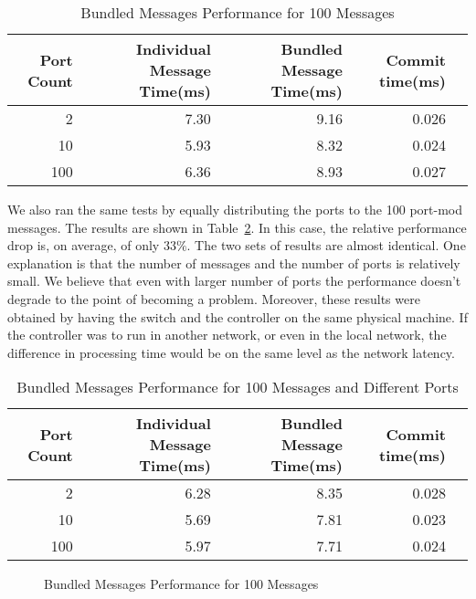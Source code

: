 \begin{table}[h]
  \centering
  \begin{tabular}{rrrrr}
    \toprule
      Port Count & Individual Message Time(ms) & Bundled Message Time(ms) & Commit time(ms) \\
    \midrule
        2 & 7.30 & 9.16 & 0.026 \\
       10 & 5.93 & 8.32 & 0.024 \\
       100 & 6.36 & 8.93 & 0.027 \\
    \bottomrule
  \end{tabular}
  \caption{Bundled Messages Performance for 100 Messages}
    \label{tbl:bundleperf}
\end{table}

We also ran the same tests by equally distributing the ports to the 100 port-mod messages. The results
are shown in Table~\ref{tbl:bundleperf2}. In this case, the relative performance drop is, on average, of only $33\%$.
The two sets of results are almost identical. One explanation is that the number of messages and the number of
ports is relatively small. We believe that even with larger number of ports the performance doesn't degrade
to the point of becoming a problem. Moreover, these results were obtained by having the switch and the controller
on the same physical machine. If the controller was to run in another network, or even in the local network,
the difference in processing time would be on the same level as the network latency.

\begin{table}[h]
  \centering
  \begin{tabular}{rrrrr}
    \toprule
      Port Count & Individual Message Time(ms) & Bundled Message Time(ms) & Commit time(ms) \\
    \midrule
        2 & 6.28 & 8.35 & 0.028 \\
       10 & 5.69 & 7.81 & 0.023 \\
       100 & 5.97 & 7.71 & 0.024 \\
    \bottomrule
  \end{tabular}
  \caption{Bundled Messages Performance for 100 Messages and Different Ports}
    \label{tbl:bundleperf2}
\end{table}

\begin{figure}[h]
  \begin{center}
    \caption{Bundled Messages Performance for 100 Messages}
    \label{fig:bundleperf}
  \end{center}
\end{figure}
